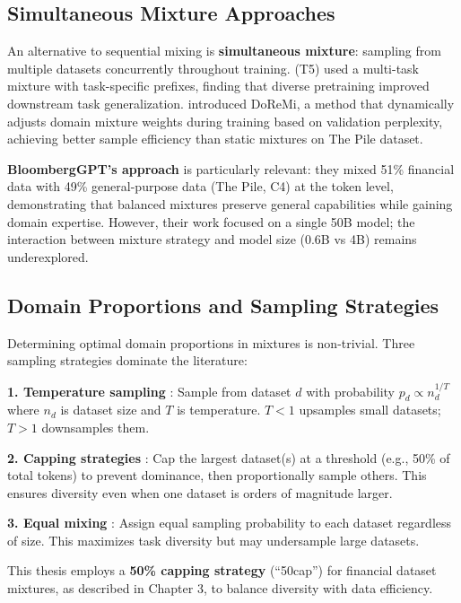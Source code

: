 \subsection{Simultaneous Mixture Approaches}

An alternative to sequential mixing is \textbf{simultaneous mixture}: sampling from multiple datasets concurrently throughout training. \textcite{raffel2020exploring} (T5) used a multi-task mixture with task-specific prefixes, finding that diverse pretraining improved downstream task generalization. \textcite{xie2023doremi} introduced DoReMi, a method that dynamically adjusts domain mixture weights during training based on validation perplexity, achieving better sample efficiency than static mixtures on The Pile dataset.

\textbf{BloombergGPT's approach} \parencite{wu2023bloomberggpt} is particularly relevant: they mixed 51\% financial data with 49\% general-purpose data (The Pile, C4) at the token level, demonstrating that balanced mixtures preserve general capabilities while gaining domain expertise. However, their work focused on a single 50B model; the interaction between mixture strategy and model size (0.6B vs 4B) remains underexplored.

\subsection{Domain Proportions and Sampling Strategies}

Determining optimal domain proportions in mixtures is non-trivial. Three sampling strategies dominate the literature:

\textbf{1. Temperature sampling} \parencite{arivazhagan2019massively}: Sample from dataset $d$ with probability $p_d \propto n_d^{1/T}$ where $n_d$ is dataset size and $T$ is temperature. $T < 1$ upsamples small datasets; $T > 1$ downsamples them.

\textbf{2. Capping strategies} \parencite{longpre2023pretrainer}: Cap the largest dataset(s) at a threshold (e.g., 50\% of total tokens) to prevent dominance, then proportionally sample others. This ensures diversity even when one dataset is orders of magnitude larger.

\textbf{3. Equal mixing} \parencite{sanh2022multitask}: Assign equal sampling probability to each dataset regardless of size. This maximizes task diversity but may undersample large datasets.

This thesis employs a \textbf{50\% capping strategy} (``50cap'') for financial dataset mixtures, as described in Chapter 3, to balance diversity with data efficiency.

